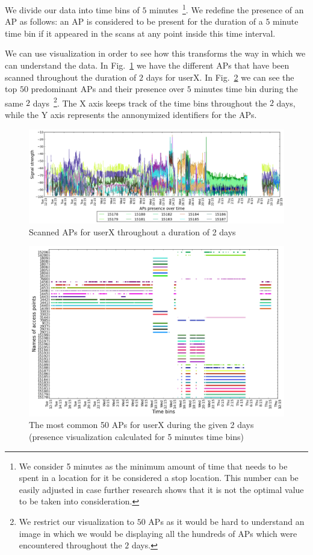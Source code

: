 We divide our data into time bins of $5$ minutes~\footnote{We consider 5 minutes
as the minimum amount of time that needs to be spent in a location for it be
considered a stop location. This number can be easily adjusted in case further
research shows that it is not the optimal value to be taken into
consideration.}. We redefine the presence of an AP as follows: an AP is
considered to be present for the duration of a $5$ minute time bin if it
appeared in the scans at any point inside this time interval.

We can use visualization in order to see how this transforms the way in which we
can understand the data. In Fig.~\ref{user_6_APs_2d} we have the different APs
that have been scanned throughout the duration of $2$ days for userX. In
Fig.~\ref{user_6_pres_2d} we can see the top $50$ predominant APs and their
presence over $5$ minutes time bin during the same $2$ days~\footnote{We
restrict our visualization to $50$ APs as it would be hard to understand an
image in which we would be displaying all the hundreds of APs which were
encountered throughout the $2$ days.}. The X axis keeps track of the time bins
throughout the $2$ days, while the Y axis represents the annonymized identifiers
for the APs.

\begin{figure}[!h]
\centering
\includegraphics[width
=\textwidth]{figures/presence/user_6_sorted_2days_plot.png}
\caption{Scanned APs for userX throughout a duration of 2 days}
\label{user_6_APs_2d}
\end{figure}

\begin{figure}[!h]
\centering
\includegraphics[width=1\textwidth]{figures/presence/user_6_sorted_2days_no_rssi_plot.png}
\caption{The most common 50 APs for userX during the given 2 days (presence
visualization calculated for 5 minutes time bins)}
\label{user_6_pres_2d}
\end{figure}

